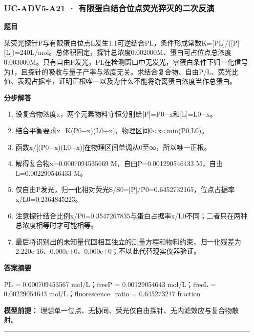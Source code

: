 \documentclass[UTF8,11pt,a4paper]{ctexart}
\begin{document}
\subsubsection*{UC-ADV5-A21 · 有限蛋白结合位点荧光猝灭的二次反演}
\noindent\textbf{题目}\par
某荧光探针P与有限蛋白位点L发生1:1可逆结合PL，条件形成常数K=[PL]/([P][L])=240L/mol。总体积固定，探针总浓度0.002000M、蛋白可占位点总浓度0.003000M。只有自由P发光，PL在检测窗口中无发光，零蛋白条件下归一化信号为1，且探针的吸收与量子产率与浓度无关。求结合复合物、自由P/L、荧光比值、表观占据率，证明正根唯一以及为什么不能将游离蛋白浓度当作总蛋白。\par
\medskip\noindent\textbf{分步解答}
\begin{enumerate}
\item 设复合物浓度x，两个元素物料守恒分别给[P]=P0−x和[L]=L0−x。
\item 结合平衡要求x=K(P0−x)(L0−x)，物理区间0<x<min(P0,L0)。
\item 函数x/[(P0−x)(L0−x)]在物理区间单调从0至∞，所以唯一正根。
\item 解得复合物x=0.0007094535669 M，自由P=0.001290546433 M，自由L=0.002290546433 M。
\item 仅自由P发光，归一化相对荧光S/S0=[P]/P0=0.6452732165，位点占据率x/L0=0.2364845223。
\item 注意探针结合比例x/P0=0.3547267835与蛋白占据率x/L0不同；二者只在两种总浓度相等时才可能相等。
\item 最后将识别出的未知量代回相互独立的测量方程和物料约束，归一化残差为 2.220e-16、0.000e+0、0.000e+0；不以此代替现实仪器验证。
\end{enumerate}
\noindent\textbf{答案摘要}\par
PL = 0.000709453567 mol/L；freeP = 0.00129054643 mol/L；freeL = 0.00229054643 mol/L；fluorescence\_ratio = 0.645273217 fraction\par
\noindent\textbf{模型前提：}
理想单一位点、无协同、荧光仅自由探针、无内滤效应与复合物散射。\par
\medskip\hrule\medskip
{}
\end{document}
